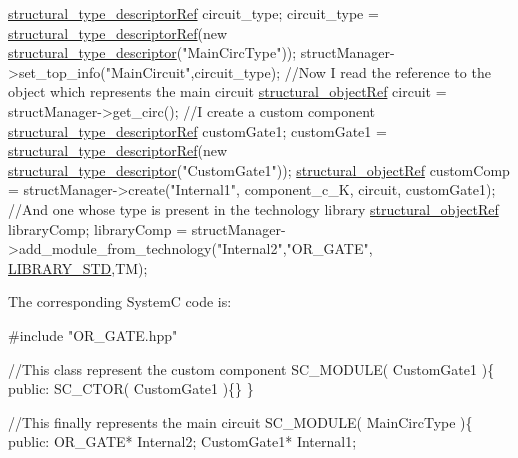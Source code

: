 \begin{DoxyItemize}
\begin{DoxyCode}
\hyperlink{structrefcount}{structural\_type\_descriptorRef} circuit\_type;
circuit\_type = \hyperlink{structural__objects_8hpp_a219296792577e3292783725961506c83}{structural\_type\_descriptorRef}(\textcolor{keyword}{new} 
      \hyperlink{structstructural__type__descriptor}{structural\_type\_descriptor}(\textcolor{stringliteral}{"MainCircType"}));
structManager->set\_top\_info(\textcolor{stringliteral}{"MainCircuit"},circuit\_type);
\textcolor{comment}{//Now I read the reference to the object which represents the main circuit}
\hyperlink{structrefcount}{structural\_objectRef} circuit = structManager->get\_circ(); 
\textcolor{comment}{//I create a custom component }
\hyperlink{structrefcount}{structural\_type\_descriptorRef} customGate1;
customGate1 = \hyperlink{structural__objects_8hpp_a219296792577e3292783725961506c83}{structural\_type\_descriptorRef}(\textcolor{keyword}{new} 
      \hyperlink{structstructural__type__descriptor}{structural\_type\_descriptor}(\textcolor{stringliteral}{"CustomGate1"}));
\hyperlink{structrefcount}{structural\_objectRef} customComp = structManager->create(\textcolor{stringliteral}{"Internal1"}, component\_c\_K, 
      circuit, customGate1);
\textcolor{comment}{//And one whose type is present in the technology library}
\hyperlink{structrefcount}{structural\_objectRef} libraryComp;
libraryComp = structManager->add\_module\_from\_technology(\textcolor{stringliteral}{"Internal2"},\textcolor{stringliteral}{"OR\_GATE"},
      \hyperlink{technology__manager_8hpp_a0033bdd1d1c034f88d486516cd90f614}{LIBRARY\_STD},TM);
\end{DoxyCode}
 The corresponding SystemC code is\+: 
\begin{DoxyCode}
\textcolor{preprocessor}{#include "OR\_GATE.hpp"}

\textcolor{comment}{//This class represent the custom component}
SC\_MODULE( CustomGate1 )\{
  \textcolor{keyword}{public}:
    SC\_CTOR( CustomGate1 )\{\}
\}

\textcolor{comment}{//This finally represents the main circuit}
SC\_MODULE( MainCircType )\{
  \textcolor{keyword}{public}:
    OR\_GATE* Internal2;
    CustomGate1* Internal1;


\end{DoxyCode}
\end{DoxyItemize}
